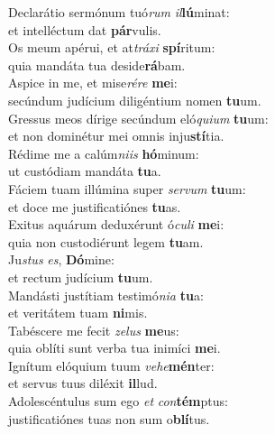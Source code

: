 \evenverse Declarátio sermónum tuó\textit{rum} \textit{il}\textbf{lú}minat:~\*\\
\evenverse et intelléctum dat \textbf{pár}vulis.\\
\oddverse Os meum apérui, et at\textit{trá}\textit{xi} \textbf{spí}ritum:~\*\\
\oddverse quia mandáta tua deside\textbf{rá}bam.\\
\evenverse Aspice in me, et mise\textit{ré}\textit{re} \textbf{me}i:~\*\\
\evenverse secúndum judícium diligéntium nomen \textbf{tu}um.\\
\oddverse Gressus meos dírige secúndum eló\textit{qui}\textit{um} \textbf{tu}um:~\*\\
\oddverse et non dominétur mei omnis inju\textbf{stí}tia.\\
\evenverse Rédime me a calúm\textit{ni}\textit{is} \textbf{hó}minum:~\*\\
\evenverse ut custódiam mandáta \textbf{tu}a.\\
\oddverse Fáciem tuam illúmina super \textit{ser}\textit{vum} \textbf{tu}um:~\*\\
\oddverse et doce me justificatiónes \textbf{tu}as.\\
\evenverse Exitus aquárum deduxérunt ó\textit{cu}\textit{li} \textbf{me}i:~\*\\
\evenverse quia non custodiérunt legem \textbf{tu}am.\\
\oddverse Ju\textit{stus} \textit{es}, \textbf{Dó}mine:~\*\\
\oddverse et rectum judícium \textbf{tu}um.\\
\evenverse Mandásti justítiam testimó\textit{ni}\textit{a} \textbf{tu}a:~\*\\
\evenverse et veritátem tuam \textbf{ni}mis.\\
\oddverse Tabéscere me fecit \textit{ze}\textit{lus} \textbf{me}us:~\*\\
\oddverse quia oblíti sunt verba tua inimíci \textbf{me}i.\\
\evenverse Ignítum elóquium tuum \textit{ve}\textit{he}\textbf{mén}ter:~\*\\
\evenverse et servus tuus diléxit \textbf{il}lud.\\
\oddverse Adolescéntulus sum ego \textit{et} \textit{con}\textbf{tém}ptus:~\*\\
\oddverse justificatiónes tuas non sum o\textbf{blí}tus.\\
